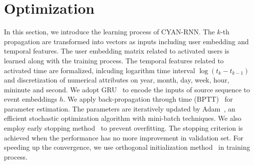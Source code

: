 \section{Optimization}

In this section, we introduce the learning process of CYAN-RNN. 
The $k$-th propagation are transformed into vectors as inputs including user
embedding and temporal features. The user embedding matrix related to activated
users is learned along with the training process. The temporal features
related to activated time are formalized, inlcuding logarithm time interval
$\log(t_k-t_{k-1})$ and discretization of numerical attributes on year, month,
day, week, hour, mininute and second. We adopt
GRU~\cite{chung2014empirical} to encode the inputs of source sequence to event
embeddings $h$. We apply back-propagation through time
(BPTT)~\cite{chauvin1995backpropagation} for parameter estimation. The
parameters are iteratively updated by Adam~\cite{kingma2015method}, an
efficient stochastic optimization algorithm with mini-batch techniques. We also
employ early stopping method~\cite{prechelt1998automatic} to prevent
overfitting. The stopping criterion is achieved when the performance has no
more improvement in validation set. For speeding up the convergence, we use
orthogonal initialization method~\cite{henaff2016orthogonal} in training
process.
